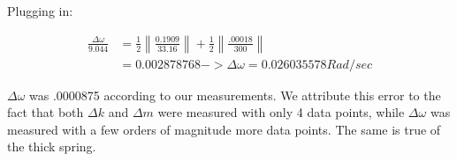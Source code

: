 \documentclass[]{article}
\begin{document}
Plugging in:

\begin{equation}\label{uncertainty}
\begin{split}
\frac{\Delta \omega}{9.044} &= \frac{1}{2} \left\| \frac{0.1909}{33.16} \right\|+ \frac{1}{2} \left\|\frac{.00018}{300} \right\| \\
&= 0.002878768 -> \Delta \omega = 0.026035578 Rad / sec
\end{split}
\end{equation}

$ \Delta \omega $ was .0000875 according to our measurements. We attribute this error to the fact that both $ \Delta k $ and $ \Delta m $ were measured with only 4 data points, while $ \Delta \omega $ was measured with a few orders of magnitude more data points. The same is true of the thick spring.
\end{document}
